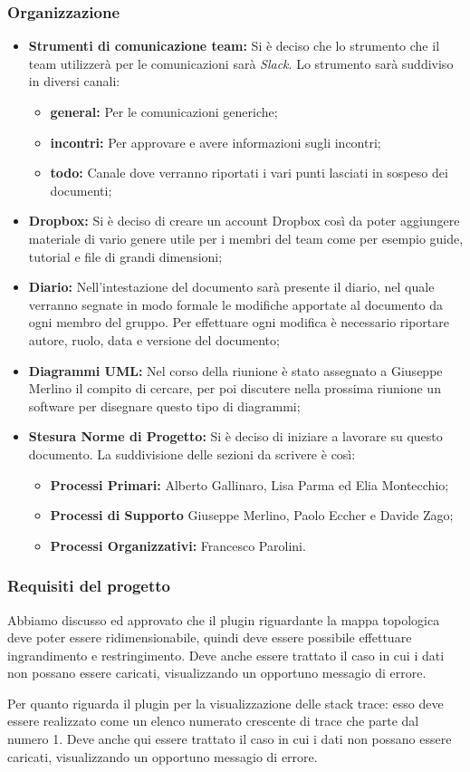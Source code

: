 \subsubsection{Organizzazione}
\begin{itemize}
	\item { \textbf{Strumenti di comunicazione team:} Si è deciso che lo strumento che il team utilizzerà per le comunicazioni sarà \textit{Slack}. Lo strumento sarà suddiviso in diversi canali:	
		\begin{itemize}
			\item { \textbf{general:} Per le comunicazioni generiche;}
			\item { \textbf{incontri:} Per approvare e avere informazioni sugli incontri;}
			\item { \textbf{todo:} Canale dove verranno riportati i vari punti lasciati in sospeso dei documenti;}
		\end{itemize}
	}
	\item { \textbf{Dropbox:} Si è deciso di creare un account Dropbox così da poter aggiungere materiale di vario genere utile per i membri del team come per esempio guide, tutorial e file di grandi dimensioni;}
	\item { \textbf{Diario:} Nell'intestazione del documento sarà presente il diario, nel quale verranno segnate in modo formale le modifiche apportate al documento da ogni membro del gruppo.
		Per effettuare ogni modifica è necessario riportare autore, ruolo, data e versione del documento;}
	\item { \textbf{Diagrammi UML:} Nel corso della riunione è stato assegnato a Giuseppe Merlino il compito di cercare, per poi discutere nella prossima riunione un software per disegnare questo tipo di diagrammi;}
	\item { \textbf{Stesura Norme di Progetto:} Si è deciso di iniziare a lavorare su questo documento. La suddivisione delle sezioni da scrivere è così: }
	\begin{itemize}
		\item { \textbf{Processi Primari:} Alberto Gallinaro, Lisa Parma ed Elia Montecchio;}
		\item { \textbf{Processi di Supporto} Giuseppe Merlino, Paolo Eccher e Davide Zago;}
		\item { \textbf{Processi Organizzativi:} Francesco Parolini.}
	\end{itemize}
\end{itemize}

\subsubsection{Requisiti del progetto}
Abbiamo discusso ed approvato che il plugin riguardante la mappa topologica deve poter essere ridimensionabile, quindi deve essere possibile effettuare ingrandimento e restringimento. Deve anche essere trattato il caso in cui i dati non possano essere caricati, visualizzando un opportuno messagio di errore.

Per quanto riguarda il plugin per la visualizzazione delle stack trace: esso deve essere realizzato come un elenco numerato crescente di trace che parte dal numero 1. Deve anche qui essere trattato il caso in cui i dati non possano essere caricati, visualizzando un opportuno messagio di errore.
